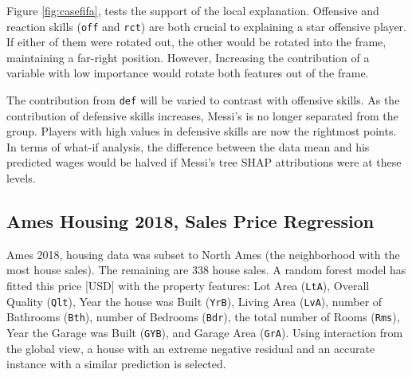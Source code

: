 \documentclass[11pt,twoside]{article}
\begin{document}
Figure \ref{fig:casefifa}, tests the support of the local explanation. Offensive and reaction skills (\texttt{off} and \texttt{rct}) are both crucial to explaining a star offensive player. If either of them were rotated out, the other would be rotated into the frame, maintaining a far-right position. However, Increasing the contribution of a variable with low importance would rotate both features out of the frame.

The contribution from \texttt{def} will be varied to contrast with offensive skills. As the contribution of defensive skills increases, Messi's is no longer separated from the group. Players with high values in defensive skills are now the rightmost points. In terms of what-if analysis, the difference between the data mean and his predicted wages would be halved if Messi's tree SHAP attributions were at these levels.

\hypertarget{ames-housing-2018-sales-price-regression}{%
\subsection{Ames Housing 2018, Sales Price Regression}\label{ames-housing-2018-sales-price-regression}}

Ames 2018, housing data was subset to North Ames (the neighborhood with the most house sales). The remaining are 338 house sales. A random forest model has fitted this price {[}USD{]} with the property features: Lot Area (\texttt{LtA}), Overall Quality (\texttt{Qlt}), Year the house was Built (\texttt{YrB}), Living Area (\texttt{LvA}), number of Bathrooms (\texttt{Bth}), number of Bedrooms (\texttt{Bdr}), the total number of Rooms (\texttt{Rms}), Year the Garage was Built (\texttt{GYB}), and Garage Area (\texttt{GrA}). Using interaction from the global view, a house with an extreme negative residual and an accurate instance with a similar prediction is selected.
\end{document}
